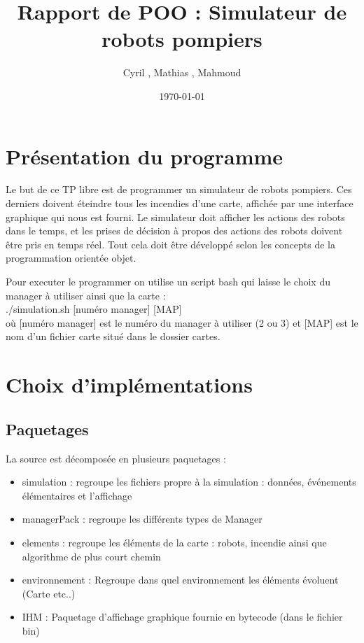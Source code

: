 \documentclass[a4paper,11pt]{article}
\title{Rapport de POO : Simulateur de robots pompiers}
\author{Cyril \bsc{Dutrieux}, Mathias \bsc{Biehler},  Mahmoud \bsc{Bentriou}}
\date{\today}
\begin{document}

\maketitle

\tableofcontents

\section{Présentation du programme}

Le but de ce TP libre est de programmer un simulateur de robots pompiers. Ces derniers doivent éteindre tous les incendies d'une carte, affichée par une interface graphique qui nous est fourni. Le simulateur doit afficher les actions des robots dans le temps, et les prises de décision à propos des actions des robots doivent être pris en temps réel. Tout cela doit être développé selon les concepts de la programmation orientée objet.

Pour executer le programmer on utilise un script bash qui laisse le choix du manager à utiliser ainsi que la carte : \\
./simulation.sh [numéro manager] [MAP] \\
où [numéro manager] est le numéro du manager à utiliser (2 ou 3) et [MAP] est le nom d'un fichier carte situé dans le dossier cartes.

\section{Choix d'implémentations}

\subsection{Paquetages}

La source est décomposée en plusieurs paquetages :
\begin{itemize}
\item simulation : regroupe les fichiers propre à la simulation : données, événements élémentaires et l'affichage
\item managerPack : regroupe les différents types de Manager 
\item elements : regroupe les éléments de la carte : robots, incendie ainsi que  algorithme de plus court chemin
\item environnement : Regroupe dans quel environnement les éléments évoluent (Carte etc..)
\item IHM : Paquetage d'affichage graphique fournie en bytecode (dans le fichier bin)
\end{itemize}
\end{document}
